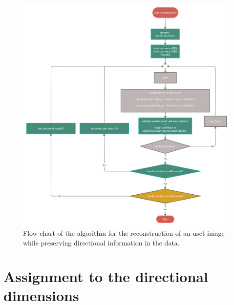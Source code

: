 \begin{figure}[H]
    \centering
    \includegraphics[width=1.13\textwidth]{Graphics/AngleIndex_Algorithm.png}
    \caption{Flow chart of the algorithm for the reconstruction of an \ac{usct} image while preserving directional information in the data.}
    \label{Basic_Algo_Angle_ident}
\end{figure}







\section{Assignment to the directional dimensions}
\label{sec:index_ident}

